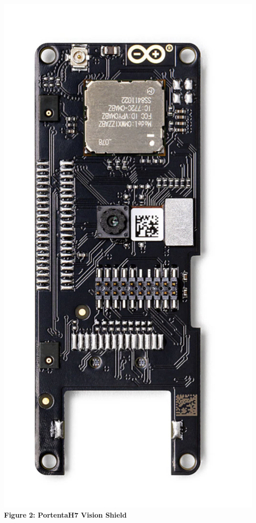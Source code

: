 \documentclass[10pt, a4paper]{beamer}
\begin{document}
\begin{frame}
\begin{columns}
			\centering
			\includegraphics[width=\textwidth]{images/PortentaVisionShield.png}
			\vspace{0.2cm}
			\textbf{Figure 2: PortentaH7 Vision Shield}
		\end{columns}
		
	\end{frame}
	
\end{document}
